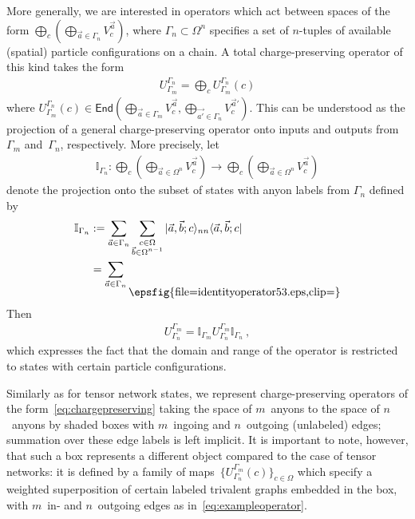 \documentclass[floats,prb,twocolumn]{revtex4}
\newcommand*{\End}{\mathsf{End}}
\newcommand{\id}{\mathbb{I}}
\def\id{\mathbb{I}}
\newcommand{\ket}[1]{|#1\rangle}
\newcommand{\bra}[1]{\langle#1|}
\newcommand*{\identityoperator}{\raisebox{-20.466pt}{\epsfig{file=identityoperator53.eps,clip=}}}
\begin{document}
More generally, we are interested in operators which act between spaces of the form $\bigoplus_c\left(\bigoplus_{\vec{a}\in\Gamma_n} V_c^{\vec{a}}\right)$, where $\Gamma_n\subset \Omega^n$ specifies a set of $n$-tuples of available (spatial) particle configurations on a chain. A total charge-preserving operator of this kind takes the form
\begin{align} 
U^{\Gamma_n}_{\Gamma_m}=\bigoplus_c U^{\Gamma_n}_{\Gamma_m}(c)\label{eq:chargepreserving}
\end{align}
where $U^{\Gamma_n}_{\Gamma_m}(c)\in\End\left(\bigoplus_{\vec{a}\in\Gamma_m} V^{\vec{a}}_c,\bigoplus_{\vec{a'}\in\Gamma_n}V^{\vec{a}'}_c\right)$.
This can be understood as the projection of a general charge-preserving operator onto inputs and outputs from~$\Gamma_m$ and~$\Gamma_n$, respectively. More precisely, let
\begin{align*}
\id_{\Gamma_n}:\bigoplus_c\left(\bigoplus_{\vec{a}\in\Omega^n} V_c^{\vec{a}}\right)\rightarrow\bigoplus_c\left(\bigoplus_{\vec{a}\in\Omega^n} V_c^{\vec{a}}\right)
\end{align*}
denote the projection onto the subset of states with anyon labels from $\Gamma_n$ defined by
\begin{align*}
\id_{\Gamma_n} &:=\sum_{\vec{a}\in\Gamma_n}\sum_{\substack{c\in\Omega\\ \vec{b}\in\Omega^{n-1}}} \ket{\vec{a},\vec{b};c}_{nn}\bra{\vec{a},\vec{b};c}\\
&=\sum_{\vec{a}\in\Gamma_n}\identityoperator
\end{align*}
Then
\begin{align}
U^{\Gamma_m}_{\Gamma_n}=\id_{\Gamma_{m}} U^{\Gamma_m}_{\Gamma_n}\id_{\Gamma_n}\ ,
\end{align}
which expresses the fact that the domain and range of the operator is restricted to states with certain particle configurations. 

Similarly as for tensor network states, we represent charge-preserving operators of the form~\eqref{eq:chargepreserving}
taking the space of $m$~anyons to the space of $n$~anyons by shaded boxes  with $m$~ingoing and $n$~outgoing (unlabeled) edges; summation over these edge labels is left implicit.  It is important to note, however, that such a box represents a different object compared to the case of tensor networks: it is defined by  a family of maps~$\{U^{\Gamma_m}_{\Gamma_n}(c)\}_{c\in \Omega}$ which specify a  weighted superposition of certain labeled trivalent graphs embedded in the box, with $m$~in- and $n$~outgoing edges as in~\eqref{eq:exampleoperator}. 
\end{document}
